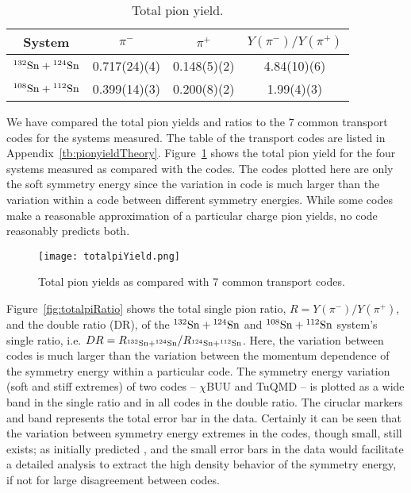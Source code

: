 \begin{table*}\centering
{}
\begin{tabular}{@{}cccc@{}}\toprule
System & $\pi^-$ & $\pi^+$ & $Y(\pi^-)/Y(\pi^+)$  \\
\midrule
${}^{132}\mathrm{Sn} + {}^{124}\mathrm{Sn}$ & 0.717(24)(4) & 0.148(5)(2) & 4.84(10)(6)  \\
${}^{108}\mathrm{Sn} + {}^{112}\mathrm{Sn}$ & 0.399(14)(3) & 0.200(8)(2) & 1.99(4)(3)  \\
\bottomrule
\end{tabular}
\caption{Total pion yield.}
\label{tb:pionyield}
\end{table*}


We have compared the total pion yields and ratios to the 7 common transport codes for the systems measured. The table of the transport codes are listed in Appendix~\ref{tb:pionyieldTheory}. Figure~\ref{fig:totalpiYield} shows the total pion yield for the four systems measured as compared with the codes. The codes plotted here are only the soft symmetry energy since the variation in code is much larger than the variation within a code between different symmetry energies. While some codes make a reasonable approximation of a particular charge pion yields, no code reasonably predicts both. 

\begin{figure}[!htb]
\centering
\texttt{[image: totalpiYield.png]}
\caption{Total pion yields as compared with 7 common transport codes.}
\label{fig:totalpiYield}
\end{figure}

Figure~\ref{fig:totalpiRatio} shows the total single pion ratio, $R = Y(\pi^-)/Y(\pi^+)$, and the double ratio (DR), of the ${}^{132}\mathrm{Sn} + {}^{124}\mathrm{Sn}$ and ${}^{108}\mathrm{Sn} + {}^{112}\mathrm{Sn}$ system's single ratio, i.e. $DR = R_{{}^{132}\mathrm{Sn} + {}^{124}\mathrm{Sn}}/R_{{}^{124}\mathrm{Sn} + {}^{112}\mathrm{Sn}}$. Here, the variation between codes is much larger than the variation between the momentum dependence of the symmetry energy within a particular code. The symmetry energy variation (soft and stiff extremes) of two codes -- $\chi$BUU and TuQMD -- is plotted as a wide band in the single ratio and in all codes in the double ratio. The ciruclar markers and band represents the total error bar in the data. Certainly it can be seen that the variation between symmetry energy extremes in the codes, though small, still exists; as initially predicted \cite{baoan_piprod1,baoan_piprod2}, and the small error bars in the data would facilitate a detailed analysis to extract the high density behavior of the symmetry energy, if not for large disagreement between codes. 



